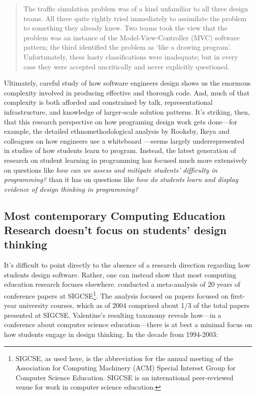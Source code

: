 \begin{quote}
The traffic simulation problem was of a kind unfamiliar to all three design teams. All three quite rightly tried immediately to assimilate the problem to something they already knew. Two teams took the view that the problem was an instance of the Model-View-Controller (MVC) software pattern; the third identified the problem as `like a drawing program'. Unfortunately, these hasty classifications were inadequate; but in every case they were accepted uncritically and never explicitly questioned. \citep[ p.~564]{jackson_representing_2010}
\end{quote}

Ultimately, careful study of how software engineers design shows us the enormous complexity involved in producing effective and thorough code. And, much of that complexity is both afforded and constrained by talk, representational infrastructure, and knowledge of larger-scale solution patterns. It's striking, then, that this research perspective on how programing design work gets done---for example, the detailed ethnomethodological analysis by Rooksby, Ikeya and colleagues on how engineers use a whiteboard \citep{rooksby_just_2010, rooksby_collaboration_2012, ikeya_recovering_2012}---seems largely underrepresented in studies of how students learn to program. Instead, the latest generation of research on student learning in programming has focused much more extensively on questions like \emph{how can we assess and mitigate students' difficulty in programming?} than it has on questions like \emph{how do students learn and display evidence of design thinking in programming?}

\subsection{Most contemporary Computing Education Research doesn't focus on students' design thinking}\label{most-contemporary-computing-education-research-doesnt-focus-on-students-design-thinking}

It's difficult to point directly to the absence of a research direction regarding how students design software. Rather, one can instead show that most computing education research focuses elsewhere. \citep{valentine_cs_2004} conducted a meta-analysis of 20 years of conference papers at SIGCSE\footnote{SIGCSE, as used here, is the abbreviation for the annual meeting of the Association for Computing Machinery (ACM) Special Interest Group for Computer Science Education. SIGCSE is an international peer-reviewed venue for work in computer science education.}. The analysis focused on papers focused on first-year university courses, which as of 2004 comprised about 1/3 of the total papers presented at SIGCSE. Valentine's resulting taxonomy reveals how---in a conference about computer science education---there is at best a minimal focus on how students engage in design thinking. In the decade from 1994-2003:

